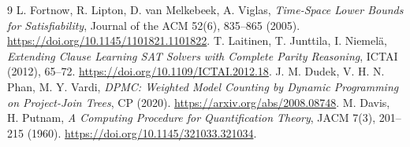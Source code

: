 \documentclass[11pt]{article}
\begin{document}
\begin{thebibliography}{9}
 L. Fortnow, R. Lipton, D. van Melkebeek, A. Viglas, \emph{Time-Space Lower Bounds for Satisfiability}, Journal of the ACM 52(6), 835--865 (2005). \url{https://doi.org/10.1145/1101821.1101822}.
 T. Laitinen, T. Junttila, I. Niemel\"a, \emph{Extending Clause Learning SAT Solvers with Complete Parity Reasoning}, ICTAI (2012), 65--72. \url{https://doi.org/10.1109/ICTAI.2012.18}.
 J. M. Dudek, V. H. N. Phan, M. Y. Vardi, \emph{DPMC: Weighted Model Counting by Dynamic Programming on Project-Join Trees}, CP (2020). \url{https://arxiv.org/abs/2008.08748}.
 M. Davis, H. Putnam, \emph{A Computing Procedure for Quantification Theory}, JACM 7(3), 201--215 (1960). \url{https://doi.org/10.1145/321033.321034}.
\end{thebibliography}
\end{document}
